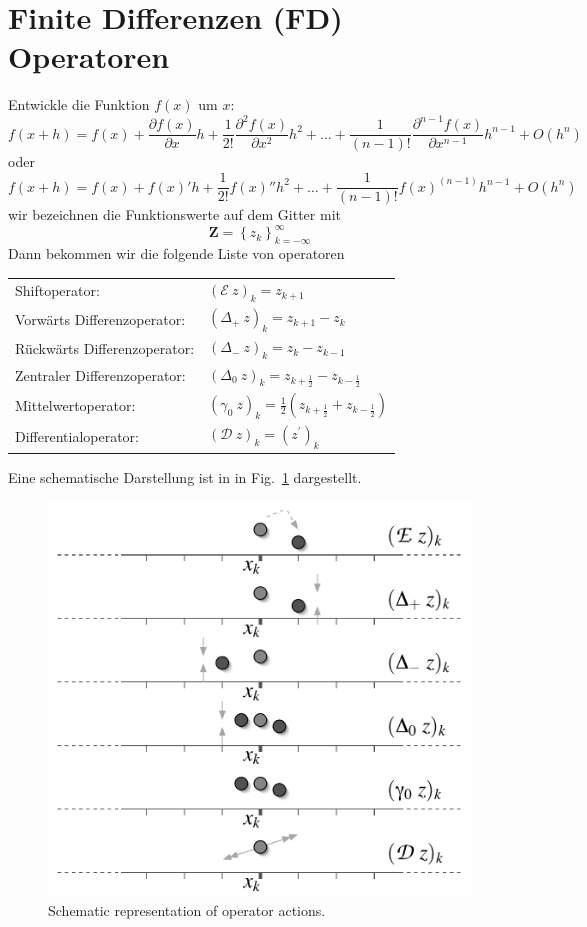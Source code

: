 \section{Finite Differenzen (FD) Operatoren}
Entwickle die Funktion $f(x)$ um $x$:
\[ f(x+h)=f(x)+\frac{\partial f(x)}{\partial x}h+\frac{1}{2!}\frac{\partial^2
f(x)}{\partial x^2}h^2+\ldots+\frac{1}{(n-1)!}\frac{\partial^{n-1}
f(x)}{\partial x^ {n-1}}h^ {n-1} +O(h^n) \]
oder
\[f(x+h)=f(x)+ f(x)' h+\frac{1}{2!} f(x)'' h^2+\ldots+\frac{1}{(n-1)!} f(x)^{(n-1)} h^ {n-1} +O(h^n)\]
wir bezeichnen die Funktionswerte auf dem Gitter mit 
\[\mathbf{Z}=\left\{ z_k\right\}_{k=-\infty}^{\infty}\]
Dann bekommen wir die folgende Liste von operatoren

\begin{tabular}{ll}
Shiftoperator:&	$(\mathcal{E}\ z)_k=z_{k+1}$\\
Vorwärts Differenzoperator:&	$(\Delta_+\ z)_k=z_{k+1}-z_{k}$\\
Rückwärts Differenzoperator:&	$(\Delta_-\ z)_k=z_{k}-z_{k-1}$\\
Zentraler Differenzoperator:&	$(\Delta_0\ z)_k=z_{k+\frac{1}{2}}-z_{k-\frac{1}{2}}$\\
Mittelwertoperator:&	$(\gamma_0\ z)_k=\frac{1}{2}(z_{k+\frac{1}{2}}+z_{k-\frac{1}{2}})$\\
Differentialoperator:&	$(\mathcal{D}\ z)_k=(z^\prime)_k$
\end{tabular}

Eine schematische Darstellung ist in in Fig.\ \ref{fig:opaction} dargestellt.
\begin{figure}[!ht]
	        \begin{center}
                \includegraphics[width=.9\textwidth]{fig/FiniteDifferenceOperators.pdf}
                \caption{Schematic representation of operator actions.\label{fig:opaction}} 
        \end{center}
\end{figure} 

